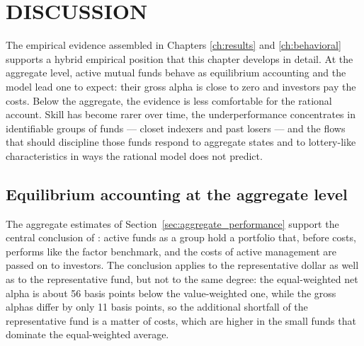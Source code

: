 \documentclass[12pt, oneside]{report}
\begin{document}


\chapter{DISCUSSION}
\label{ch:discussion}

\noindent The empirical evidence assembled in Chapters \ref{ch:results}
and \ref{ch:behavioral} supports a hybrid empirical position that this
chapter develops in detail. At the aggregate level, active mutual funds
behave as equilibrium accounting and the \textcite{BerkGreen2004} model
lead one to expect: their gross alpha is close to zero and investors pay
the costs. Below the aggregate, the evidence is less comfortable for the
rational account. Skill has become rarer over time, the
underperformance concentrates in identifiable groups of funds --- closet
indexers and past losers --- and the flows that should discipline those
funds respond to aggregate states and to lottery-like characteristics in
ways the rational model does not predict.

\section{Equilibrium accounting at the aggregate level}
\label{sec:bg_accepted}

\noindent The aggregate estimates of Section~\ref{sec:aggregate_performance}
support the central conclusion of \textcite{FamaFrench2010}: active
funds as a group hold a portfolio that, before costs, performs like the
factor benchmark, and the costs of active management are passed on to
investors. The conclusion applies to the representative dollar as well as
to the representative fund, but not to the same degree: the
equal-weighted net alpha is about 56 basis points below the
value-weighted one, while the gross alphas differ by only 11 basis
points, so the additional shortfall of the representative fund is a
matter of costs, which are higher in the small funds that dominate the
equal-weighted average.
\end{document}
